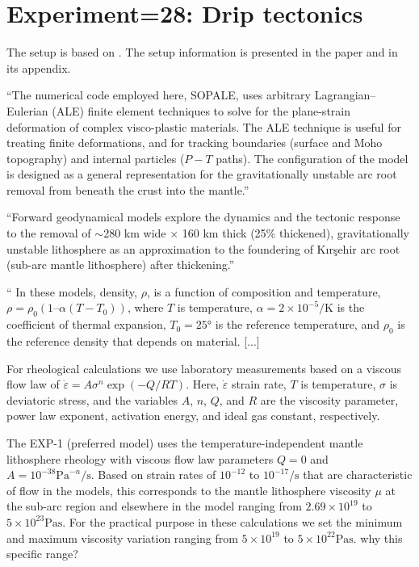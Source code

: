 
\section{Experiment=28: Drip tectonics}

The setup is based on .
The setup information is presented in the paper and in its appendix. 

``The numerical code employed here, SOPALE, uses arbitrary
Lagrangian–Eulerian (ALE) ﬁnite element techniques to solve for the plane-strain
deformation of complex visco-plastic materials. The ALE technique is useful for
treating ﬁnite deformations, and for tracking boundaries (surface and Moho
topography) and internal particles ($P-T$ paths). The conﬁguration of the
model is designed as a general representation for the gravitationally unstable arc
root removal from beneath the crust into the mantle.''

``Forward geodynamical models explore the
dynamics and the tectonic response to the removal of $\sim$280 km
wide $\times$ 160 km thick (25\% thickened), gravitationally unstable
lithosphere as an approximation to the foundering of Kırşehir arc
root (sub-arc mantle lithosphere) after thickening.'' 

``
In these models, density, $\rho$, is a function of composition and
temperature, $\rho = \rho_0 (1–\alpha (T-T_0))$, 
where $T$ is temperature, $\alpha = 2 \times 10^{-5}\si{\per\kelvin}$ is the coefficient of 
thermal expansion, $T_0 = 25\si{\degree}$ is
the reference temperature, and $\rho_0$ is the reference density that
depends on material. [...]

For rheological calculations we use laboratory measurements
based on a viscous ﬂow law of 
$\dot\varepsilon = A \sigma^n \exp (-Q/RT)$. 
Here, $\dot\varepsilon$ strain rate, $T$ is temperature, $\sigma$ 
is deviatoric stress, and the
variables $A$, $n$, $Q$, and $R$ are the viscosity parameter, power law
exponent, activation energy, and ideal gas constant, respectively.

The EXP-1 (preferred model) uses the temperature-independent
mantle lithosphere rheology with viscous ﬂow law parameters
$Q=0$ and $A=10^{-38}\si{\pascal}^{-n}\si{\per\second}$. Based on strain rates of $10^{-12}$ to
$10^{-17}\si{\per\second}$ that are characteristic of ﬂow in the models, this
corresponds to the mantle lithosphere viscosity $\mu$ at the sub-arc
region and elsewhere in the model ranging from $2.69 \times 10^{19}$ to
$5 \times 10^{23}\si{\pascal\second}$. For the practical purpose in these calculations we set
the minimum and maximum viscosity variation ranging from
$5\times 10^{19}$ to $5 \times 10^{22}\si{\pascal\second}$.
{\color{red} why this specific range?}



